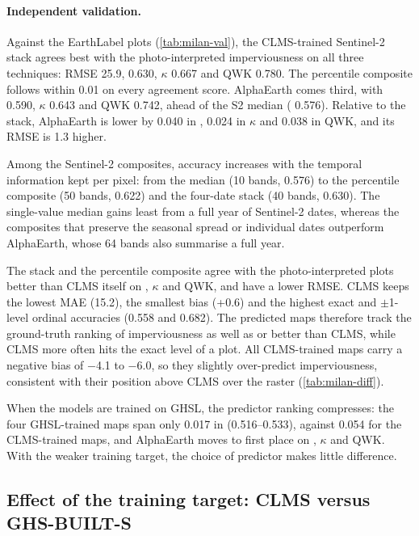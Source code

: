 \paragraph{Independent validation.} Against the EarthLabel plots
(\cref{tab:milan-val}), the CLMS-trained Sentinel-2 stack agrees best with
the photo-interpreted imperviousness on all three techniques: RMSE
25.9\pp, \Rsq{} 0.630, $\kappa$ 0.667 and QWK 0.780. The percentile
composite follows within 0.01 on every agreement score. AlphaEarth comes
third, with \Rsq{} 0.590, $\kappa$ 0.643 and QWK 0.742, ahead of the S2
median (\Rsq{} 0.576). Relative to the stack, AlphaEarth is lower by 0.040 in
\Rsq, 0.024 in $\kappa$ and 0.038 in QWK, and its RMSE is 1.3\pp{} higher.

Among the Sentinel-2 composites, accuracy increases with the temporal
information kept per pixel: from the median (10 bands, \Rsq{} 0.576) to the
percentile composite (50 bands, 0.622) and the four-date stack (40 bands,
0.630). The single-value median gains least from a full year of Sentinel-2
dates, whereas the composites that preserve the seasonal spread or individual
dates outperform AlphaEarth, whose 64 bands also summarise a full year.

The stack and the percentile composite agree with the photo-interpreted
plots better than CLMS itself on \Rsq, $\kappa$ and QWK, and have a lower
RMSE. CLMS keeps the lowest MAE (15.2\pp), the smallest bias
(+0.6\pp) and the highest exact and $\pm$1-level ordinal accuracies (0.558
and 0.682). The predicted maps therefore track the ground-truth ranking of
imperviousness as well as or better than CLMS, while CLMS more often hits
the exact level of a plot. All CLMS-trained maps carry a negative bias of
$-$4.1 to $-$6.0\pp, so they slightly over-predict imperviousness, consistent
with their position above CLMS over the raster (\cref{tab:milan-diff}).

When the models are trained on GHSL, the predictor ranking compresses:
the four GHSL-trained maps span only 0.017 in \Rsq{} (0.516--0.533),
against 0.054 for the CLMS-trained maps, and AlphaEarth moves to first place
on \Rsq, $\kappa$ and QWK. With the weaker training target, the choice of
predictor makes little difference.

\subsection{Effect of the training target: CLMS versus GHS-BUILT-S}
\label{sec:res-target}

